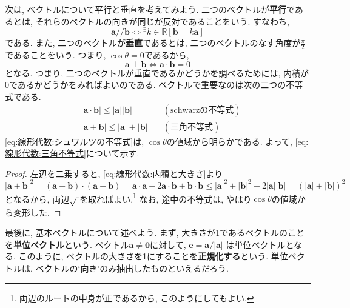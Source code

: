         次は, ベクトルについて平行と垂直を考えてみよう. 二つのベクトルが\textbf{平行}であるとは, それらのベクトルの向きが同じが反対であることをいう. すなわち,
        \begin{equation}
            \bm{a}/\!/\bm{b}\Leftrightarrow {}^\exists k\in\mathbb{R}\left[\bm{b}=k\bm{a}\right] \label{eq:線形代数:ベクトルの平行}
        \end{equation}
        である. また, 二つのベクトルが\textbf{垂直}であるとは, 二つのベクトルのなす角度が$\frac{\pi}{2}$であることをいう. つまり, $\cos\theta=0$であるから, 
        \begin{equation}
            \bm{a}\perp\bm{b}\Leftrightarrow \bm{a}\cdot\bm{b}=0 \label{eq:線形代数:ベクトルの垂直}
        \end{equation}
        となる. つまり, 二つのベクトルが垂直であるかどうかを調べるためには, 内積が0であるかどうかをみればよいのである.
        \clearpage
        ベクトルで重要なのは次の二つの不等式である.
        \begin{align}
            &|\bm{a}\cdot\bm{b}|\leq |\bm{a}||\bm{b}| &\quad(\text{schwarzの不等式}) \label{eq:線形代数:シュワルツの不等式}\\
            &|\bm{a}+\bm{b}| \leq |\bm{a}|+|\bm{b}| &\quad(\text{三角不等式}) \label{eq:線形代数:三角不等式}
        \end{align}
        \eqref{eq:線形代数:シュワルツの不等式}は, $\cos\theta$の値域から明らかである. よって, \eqref{eq:線形代数:三角不等式}について示す.

        \begin{proof}
            左辺を二乗すると, \eqref{eq:線形代数:内積と大きさ}より
            \begin{equation*}
                |\bm{a}+\bm{b}|^2 = (\bm{a}+\bm{b})\cdot (\bm{a}+\bm{b})=\bm{a}\cdot\bm{a} + 2\bm{a}\cdot\bm{b}+\bm{b}\cdot\bm{b}\leq|\bm{a}|^2+|\bm{b}|^2+2|\bm{a}||\bm{b}|=(|\bm{a}|+|\bm{b}|)^2
            \end{equation*}
            となるから, 両辺$\sqrt{\hspace{1mm}}$を取ればよい.\footnote{両辺のルートの中身が正であるから, このようにしてもよい.} なお, 途中の不等式は, やはり$\cos\theta$の値域から変形した.
        \end{proof}

        最後に, 基本ベクトルについて述べよう. まず, 大きさが1であるベクトルのことを\textbf{単位ベクトル}という. ベクトル$\bm{a}\neq\bm{0}$に対して, $\bm{e}=\bm{a}/|\bm{a}|$
        は単位ベクトルとなる. このように, ベクトルの大きさを1にすることを\textbf{正規化する}という. 単位ベクトルは, ベクトルの`向き'のみ抽出したものといえるだろう.
        
